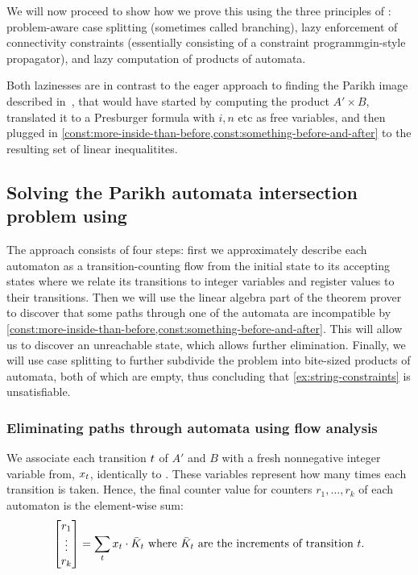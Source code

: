 We will now proceed to show how we prove this using the three principles of
\Calculus{}: problem-aware case splitting (sometimes called branching), lazy
enforcement of connectivity constraints (essentially consisting of a constraint
programmgin-style propagator), and lazy computation of products of automata.

Both lazinesses are in contrast to the eager approach to finding the Parikh
image described in~\cite{generate-parikh-image}, that would have started by
computing the product $A' \times B$, translated it to a Presburger formula with
$i, n$ etc as free variables, and then plugged in
\cref{const:more-inside-than-before,const:something-before-and-after} to the
resulting set of linear inequalitites.

\subsection{Solving the Parikh automata intersection problem using \Calculus{}}

The approach consists of four steps: first we approximately describe each
automaton as a transition-counting flow from the initial state to its accepting
states where we relate its transitions to integer variables and register values
to their transitions. Then we will use the linear algebra part of the theorem
prover to discover that some paths through one of the automata are incompatible
by \cref{const:more-inside-than-before,const:something-before-and-after}. This
will allow us to discover an unreachable state, which allows further
elimination. Finally, we will use case splitting to further subdivide the
problem into bite-sized products of automata, both of which are empty, thus
concluding that \cref{ex:string-constraints} is unsatisfiable.

\subsubsection{Eliminating paths through automata using flow analysis}

We associate each transition $t$ of $A'$ and $B$ with a fresh
nonnegative integer variable from, $x_t$, identically to
\cite{generate-parikh-image}. These variables represent how many times each
transition is taken. Hence, the final counter value for counters $r_1, \ldots,
r_k$ of each automaton is the element-wise sum:
\begin{equation}\label{eq:counter-sums}
\begin{bmatrix} 
  r_1 \\
  \vdots\\
  r_k \\
\end{bmatrix} = \sum_t x_t \cdot 
  \bar{K}_t \text{ where $\bar{K}_t$ are the increments of transition $t$}.
\end{equation}

